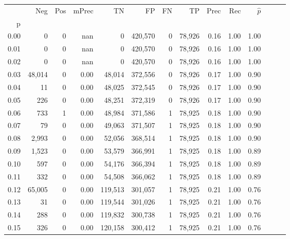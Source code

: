 \begin{tabular}{rrrrrrrrrrrrrr}
\toprule
{} &     Neg &     Pos & mPrec &       TN &       FP &      FN &      TP &  Prec &   Rec & $\hat{p}$ \\
p    &         &         &       &          &          &         &         &       &       &           \\
\midrule
0.00 &       0 &       0 &   nan &        0 &  420,570 &       0 &  78,926 &  0.16 &  1.00 &      1.00 \\
0.01 &       0 &       0 &   nan &        0 &  420,570 &       0 &  78,926 &  0.16 &  1.00 &      1.00 \\
0.02 &       0 &       0 &   nan &        0 &  420,570 &       0 &  78,926 &  0.16 &  1.00 &      1.00 \\
0.03 &  48,014 &       0 &  0.00 &   48,014 &  372,556 &       0 &  78,926 &  0.17 &  1.00 &      0.90 \\
0.04 &      11 &       0 &  0.00 &   48,025 &  372,545 &       0 &  78,926 &  0.17 &  1.00 &      0.90 \\
0.05 &     226 &       0 &  0.00 &   48,251 &  372,319 &       0 &  78,926 &  0.17 &  1.00 &      0.90 \\
0.06 &     733 &       1 &  0.00 &   48,984 &  371,586 &       1 &  78,925 &  0.18 &  1.00 &      0.90 \\
0.07 &      79 &       0 &  0.00 &   49,063 &  371,507 &       1 &  78,925 &  0.18 &  1.00 &      0.90 \\
0.08 &   2,993 &       0 &  0.00 &   52,056 &  368,514 &       1 &  78,925 &  0.18 &  1.00 &      0.90 \\
0.09 &   1,523 &       0 &  0.00 &   53,579 &  366,991 &       1 &  78,925 &  0.18 &  1.00 &      0.89 \\
0.10 &     597 &       0 &  0.00 &   54,176 &  366,394 &       1 &  78,925 &  0.18 &  1.00 &      0.89 \\
0.11 &     332 &       0 &  0.00 &   54,508 &  366,062 &       1 &  78,925 &  0.18 &  1.00 &      0.89 \\
0.12 &  65,005 &       0 &  0.00 &  119,513 &  301,057 &       1 &  78,925 &  0.21 &  1.00 &      0.76 \\
0.13 &      31 &       0 &  0.00 &  119,544 &  301,026 &       1 &  78,925 &  0.21 &  1.00 &      0.76 \\
0.14 &     288 &       0 &  0.00 &  119,832 &  300,738 &       1 &  78,925 &  0.21 &  1.00 &      0.76 \\
0.15 &     326 &       0 &  0.00 &  120,158 &  300,412 &       1 &  78,925 &  0.21 &  1.00 &      0.76 \\

\end{tabular}
